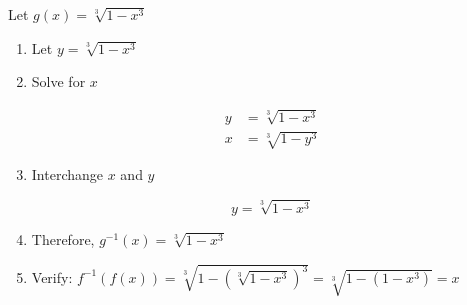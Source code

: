 \documentclass{article}
\begin{document}
\vspace{10pt}

Let $g(x)=\sqrt[3]{1-x^3}$

\begin{enumerate}
\item Let $y=\sqrt[3]{1-x^3}$
\item Solve for $x$

\begin{align*}
y&=\sqrt[3]{1-x^3}\\
x&=\sqrt[3]{1-y^3}
\end{align*}

\item Interchange $x$ and $y$

\[y=\sqrt[3]{1-x^3}\]

\item Therefore, $g^{-1}(x)=\sqrt[3]{1-x^3}$
\item Verify: $f^{-1}(f(x))=\sqrt[3]{1-(\sqrt[3]{1-x^3})^3}=\sqrt[3]{1-(1-x^3)}=x$
\end{enumerate}
\end{document}
